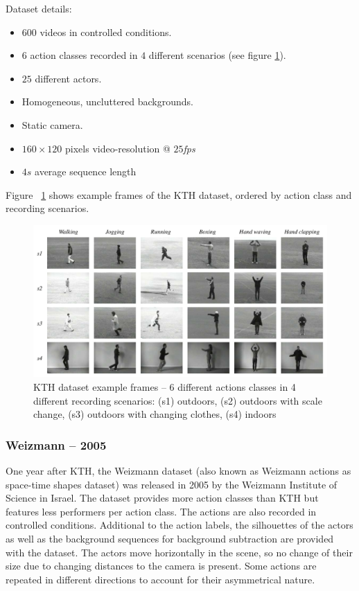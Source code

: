 Dataset details: \cite{schuldt_recognizing_2004}
\begin{itemize}
    \item $600$ videos in controlled conditions.
    \item $6$ action classes recorded in $4$ different scenarios (see figure \ref{fig:kth_example}).
    \item $25$ different actors.
    \item Homogeneous, uncluttered backgrounds.
    \item Static camera.
    \item $160 \times 120$ pixels video-resolution @ $25$\textit{fps}
    \item $4s$ average sequence length
\end{itemize}

Figure ~\ref{fig:kth_example} shows example frames of the KTH dataset, ordered by action class and recording scenarios.

\begin{figure}[H]
    \centering
    \includegraphics[width=\textwidth]{img_datasets/kth_example}
    \caption{KTH dataset example frames -- 6 different actions classes in 4 different recording scenarios: (s1) outdoors, (s2) outdoors with scale change, (s3) outdoors with changing clothes, (s4) indoors \cite{schuldt_recognizing_2004}}
    \label{fig:kth_example}
\end{figure}


\subsubsection{Weizmann -- 2005}
One year after KTH, the Weizmann dataset \cite{blank_actions_2005} (also known as Weizmann actions as space-time shapes dataset) was released in 2005 by the Weizmann Institute of Science in Israel.
The dataset provides more action classes than KTH but features less performers per action class.
The actions are also recorded in controlled conditions.
Additional to the action labels, the silhouettes of the actors as well as the background sequences for background subtraction are provided with the dataset.
The actors move horizontally in the scene, so no change of their size due to changing distances to the camera is present.
Some actions are repeated in different directions to account for their asymmetrical nature.

